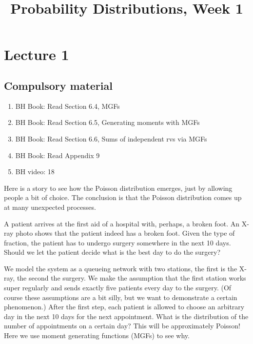 


\title{Probability Distributions, Week 1}


\maketitle

\toccontents

\section{Lecture 1}
\label{sec:lecture-1}


\subsection{Compulsory material}

\begin{enumerate}
\item BH Book: Read Section 6.4, MGFs
\item BH Book: Read Section 6.5, Generating moments with MGFs
\item BH Book: Read Section 6.6, Sums of independent rvs via MGFs
\item BH Book: Read Appendix 9
\item BH video: 18
\end{enumerate}


Here is a story to see how the Poisson distribution emerges, just by allowing people a bit of choice.
The conclusion is that the Poisson distribution comes up at many unexpected processes.

A patient arrives at the first aid of a hospital with, perhaps, a broken foot.
An X-ray photo shows that the patient indeed has a broken foot.
Given the type of fraction, the patient has to undergo surgery somewhere in the next 10 days.
Should we let the patient decide what is the best day to do the surgery?

We model the system as a queueing network with two stations, the first is the X-ray, the second the surgery.
We make the assumption that the first station works super regularly and sends exactly five patients every day to the surgery.
(Of course these assumptions are a bit silly, but we want to demonstrate a certain phenomenon.)
After the first step, each patient is allowed to choose an arbitrary day in the next 10 days for the next appointment.
What is the distribution of the number of appointments on a certain day?
This will be approximately Poisson!
Here we use moment generating functions (MGFs) to see why.

